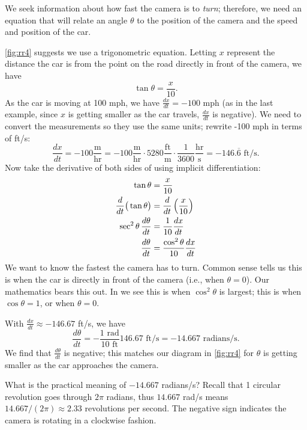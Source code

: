 {We seek information about how fast the camera is to \textit{turn}; therefore, we need an equation that will relate an angle $\theta$ to the position of the camera and the speed and position of the car.

\autoref{fig:rr4} suggests we use a trigonometric equation. Letting $x$ represent the distance the car is from the point on the road directly in front of the camera, we have
\begin{equation}\tan \theta = \frac{x}{10}.\label{eq:rr4}\end{equation}
As the car is moving at 100 mph, we have $\frac{dx}{dt} = -100$ mph (as in the last example, since $x$ is getting smaller as the car travels, $\frac{dx}{dt}$ is negative). We need to convert the measurements so they use the same units; rewrite -100 mph in terms of ft/s:
\[
\frac{dx}{dt} = -100\frac{\text{m}}{\text{hr}} = -100\frac{\text{m}}{\text{hr}}\cdot5280\frac{\text{ft}}{\text{m}}\cdot\frac{1}{3600}\frac{\text{hr}}{\text{s}} =-146.\overline{6}\text{ ft/s}.
\]
Now take the derivative of both sides of  using implicit differentiation:
\begin{align}
	\tan \theta &= \frac{x}{10} \notag \\
	\frac{d}{dt}\big(\tan \theta\big)
	&= \frac{d}{dt}\left(\frac{x}{10}\right)\notag \\
	\sec^2\theta\,\frac{d\theta}{dt} &= \frac{1}{10}\frac{dx}{dt}\notag\\
	\frac{d\theta}{dt} &= \frac{\cos^2\theta}{10}\frac{dx}{dt}\label{eq:rr4b}
\end{align}
We want to know the fastest the camera has to turn. Common sense tells us this is when the car is directly in front of the camera (i.e., when $\theta = 0$). Our mathematics bears this out. In  we see this is when $\cos^2\theta$ is largest; this is when $\cos \theta = 1$, or when $\theta = 0$.

With $\frac{dx}{dt} \approx -146.67$ ft/s, we have
\[
 \frac{d\theta}{dt}
 = -\frac{1\text{ rad}}{10\text{ ft}}146.67\text{ ft/s}
 = -14.667\text{ radians/s}.
\]
We find that $\frac{d\theta}{dt}$ is negative; this matches our diagram in \autoref{fig:rr4} for $\theta$ is getting smaller as the car approaches the camera.	
	
What is the practical meaning of $-14.667$ radians/s? Recall that 1 circular revolution goes through $2\pi$ radians, thus $14.667$ rad/s means $14.667/(2\pi)\approx 2.33$ revolutions per second. The negative sign indicates the camera is rotating in a clockwise fashion.}

